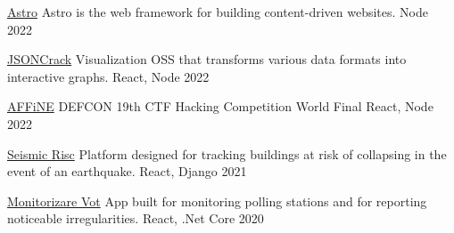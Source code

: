 



\begin{cvhonors}

  \cvhonor
    {\href{https://github.com/withastro/astro}{Astro}} %
    {Astro is the web framework for building content-driven websites.} %
    {Node} %
    {2022} %

  \cvhonor
    {\href{https://github.com/AykutSarac/jsoncrack.com}{JSONCrack}} %
    {Visualization OSS that transforms various data formats into interactive graphs.} %
    {React, Node} %
    {2022} %

  \cvhonor
    {\href{https://github.com/toeverything/AFFiNE}{AFFiNE}} %
    {DEFCON 19th CTF Hacking Competition World Final} %
    {React, Node} %
    {2022} %

  \cvhonor
    {\href{https://github.com/code4romania/seismic-risc}{Seismic Risc}} %
    {Platform designed for tracking buildings at risk of collapsing in the event of an earthquake.} %
    {React, Django} %
    {2021} %

  \cvhonor
    {\href{https://github.com/code4romania/monitorizare-vot}{Monitorizare Vot}} %
    {App built for monitoring polling stations and for reporting noticeable irregularities.} %
    {React, .Net Core} %
    {2020} %

\end{cvhonors}


